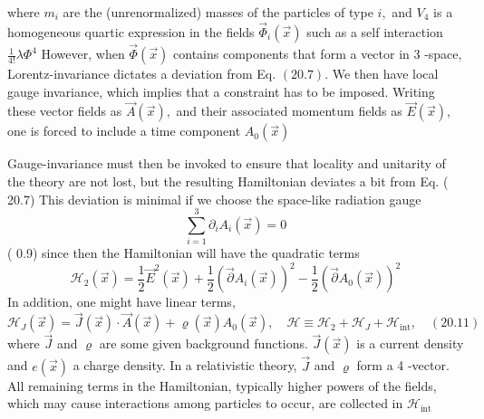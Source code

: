 \documentclass[main.tex]{subfiles}
\begin{document}
where $m_{i}$ are the (unrenormalized) masses of the particles of type $i,$ and $V_{4}$ is a homogeneous quartic expression in the fields $\vec{\Phi}_{i}(\vec{x})$ such as a self interaction $\frac{1}{4 !} \lambda \Phi^{4}$ However, when $\vec{\Phi}(\vec{x})$ contains components that form a vector in 3 -space, Lorentz-invariance dictates a deviation from Eq. $(20.7) .$ We then have local gauge invariance, which implies that a constraint has to be imposed. Writing these vector fields as $\vec{A}(\vec{x}),$ and their associated momentum fields as $\vec{E}(\vec{x}),$ one is forced to include a time component $A_{0}(\vec{x})$

Gauge-invariance must then be invoked to ensure that locality and unitarity of the theory are not lost, but the resulting Hamiltonian deviates a bit from Eq. ( 20.7) This deviation is minimal if we choose the space-like radiation gauge
$$
\sum_{i=1}^{3} \partial_{i} A_{i}(\vec{x})=0
$$
( 0.9)
since then the Hamiltonian will have the quadratic terms
$$
\mathcal{H}_{2}(\vec{x})=\frac{1}{2} \vec{E}^{2}(\vec{x})+\frac{1}{2}\left(\vec{\partial} A_{i}(\vec{x})\right)^{2}-\frac{1}{2}\left(\vec{\partial} A_{0}(\vec{x})\right)^{2}
$$
In addition, one might have linear terms,
$$
\mathcal{H}_{J}(\vec{x})=\vec{J}(\vec{x}) \cdot \vec{A}(\vec{x})+\varrho(\vec{x}) A_{0}(\vec{x}), \quad \mathcal{H} \equiv \mathcal{H}_{2}+\mathcal{H}_{J}+\mathcal{H}_{\mathrm{int}}, \quad(20.11)
$$
where $\vec{J}$ and $\varrho$ are some given background functions. $\vec{J}(\vec{x})$ is a current density and $e(\vec{x})$ a charge density. In a relativistic theory, $\vec{J}$ and $\varrho$ form a 4 -vector. All remaining terms in the Hamiltonian, typically higher powers of the fields, which may cause interactions among particles to occur, are collected in $\mathcal{H}_{\mathrm{int}}$
\end{document}
